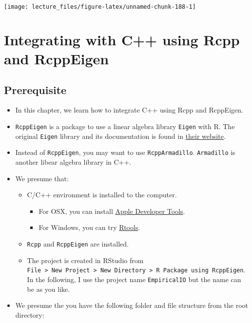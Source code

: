 \documentclass[]{book}
\providecommand{\tightlist}{%
  \setlength{\itemsep}{0pt}\setlength{\parskip}{0pt}}
\begin{document}
\begin{center}\texttt{[image: lecture\_files/figure-latex/unnamed-chunk-188-1]} \end{center}

\chapter{Integrating with C++ using Rcpp and RcppEigen}\label{rcpp}

\section{Prerequisite}\label{prerequisite}

\begin{itemize}
\item
  In this chapter, we learn how to integrate C++ using Rcpp and
  RcppEigen.
\item
  \texttt{RcppEigen} is a package to use a linear algebra library
  \texttt{Eigen} with R. The original \texttt{Eigen} library and its
  documentation is found in
  \href{http://eigen.tuxfamily.org/index.php?title=Main_Page}{their
  website}.
\item
  Instead of \texttt{RcppEigen}, you may want to use
  \texttt{RcppArmadillo}. \texttt{Armadillo} is another libear algebra
  library in C++.
\item
  We presume that:

  \begin{itemize}
  \tightlist
  \item
    C/C++ environment is installed to the computer.

    \begin{itemize}
    \tightlist
    \item
      For OSX, you can install
      \href{https://developer.apple.com/xcode/}{Apple Developer Tools}.
    \item
      For Windows, you can try
      \href{https://cran.r-project.org/bin/windows/Rtools/}{Rtools}.
    \end{itemize}
  \item
    \texttt{Rcpp} and \texttt{RcppEigen} are installed.
  \item
    The project is created in RStudio from
    \texttt{File\ \textgreater{}\ New\ Project\ \textgreater{}\ New\ Directory\ \textgreater{}\ R\ Package\ using\ RcppEigen}.
    In the following, I use the project name \texttt{EmpiricalIO} but
    the name can be as you like.
  \end{itemize}
\item
  We presume the you have the following folder and file structure from
  the root directory:


\end{itemize}
\end{document}
